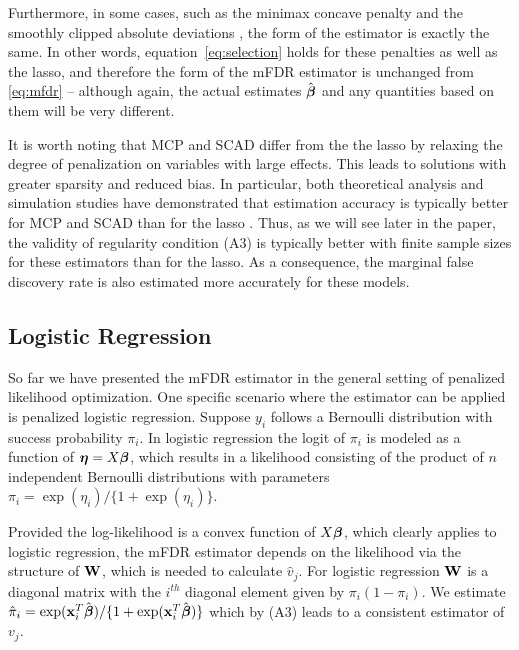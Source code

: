Furthermore, in some cases, such as the minimax concave penalty \citep[MCP; ][]{MCP} and the smoothly clipped absolute deviations \citep[SCAD; ][]{SCAD}, the form of the estimator is exactly the same.  In other words, equation~\eqref{eq:selection} holds for these penalties as well as the lasso, and therefore the form of the mFDR estimator is unchanged from \eqref{eq:mfdr} -- although again, the actual estimates $\hat{\boldsymbol{\beta}}$ and any quantities based on them will be very different.

It is worth noting that MCP and SCAD differ from the the lasso by relaxing the degree of penalization on variables with large effects.  This leads to solutions with greater sparsity and reduced bias.  In particular, both theoretical analysis and simulation studies have demonstrated that estimation accuracy is typically better for MCP and SCAD than for the lasso \citep{MCP,SCAD,Breheny2011}.  Thus, as we will see later in the paper, the validity of regularity condition (A3) is typically better with finite sample sizes for these estimators than for the lasso.  As a consequence, the marginal false discovery rate is also estimated more accurately for these models.

\subsection{Logistic Regression}

So far we have presented the mFDR estimator in the general setting of penalized likelihood optimization. One specific scenario where the estimator can be applied is penalized logistic regression. Suppose $y_i$ follows a Bernoulli distribution with success probability $\pi_i$. In logistic regression the logit of $\pi_i$ is modeled as a function of $\boldsymbol{\eta} = X\boldsymbol{\beta}$, which results in a likelihood consisting of the product of $n$ independent Bernoulli distributions with parameters $\pi_i = \exp(\eta_i)/\{1 + \exp(\eta_i)\}$.


Provided the log-likelihood is a convex function of $X\boldsymbol{\beta}$, which clearly applies to logistic regression, the mFDR estimator depends on the likelihood via the structure of $\mathbf{W}$, which is needed to calculate $\hat{v}_j$. For logistic regression $\mathbf{W}$ is a diagonal matrix with the $i^{th}$ diagonal element given by $\pi_i(1 - \pi_i)$. We estimate $\hat{\pi}_i = \exp(\mathbf{x}_i^T\hat{\boldsymbol{\beta}})/\{1 +\exp(\mathbf{x}_i^T\hat{\boldsymbol{\beta}})\}$ which by (A3) leads to a consistent estimator of $v_j$.

